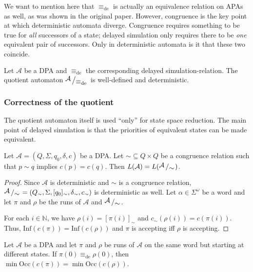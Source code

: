 We want to mention here that $\equiv_\text{de}$ is actually an equivalence relation on APAs as well, as was shown in the original paper. However, congruence is the key point at which deterministic automata diverge. Congruence requires something to be true for \emph{all} successors of a state; delayed simulation only requires there to be \emph{one} equivalent pair of successors. Only in deterministic automata is it that these two coincide.

\begin{cor}
	Let $\mathcal{A}$ be a DPA and $\equiv_\text{de}$ the corresponding delayed simulation-relation. The quotient automaton $\bigslant{\mathcal{A}}{\equiv_\text{de}}$ is well-defined and deterministic.
\end{cor}



\vspace{1cm}
\subsubsection*{Correctness of the quotient}
The quotient automaton itself is used \enquote{only} for state space reduction. The main point of delayed simulation is that the priorities of equivalent states can be made equivalent. 

\begin{theorem}
	Let $\mathcal{A} = (Q, \Sigma, q_0, \delta, c)$ be a DPA. Let $\sim \subseteq Q \times Q$ be a congruence relation such that $p \sim q$ implies $c(p) = c(q)$. Then $L(\mathcal{A}) = L(\bigslant{\mathcal{A}}{\sim})$.
\end{theorem}

\begin{proof}
	Since $\mathcal{A}$ is deterministic and $\sim$ is a congruence relation, $\bigslant{\mathcal{A}}{\sim} = (Q_\sim, \Sigma, [q_0]_\sim, \delta_\sim, c_\sim)$ is deterministic as well. Let $\alpha \in \Sigma^\omega$ be a word and let $\pi$ and $\rho$ be the runs of $\mathcal{A}$ and $\bigslant{\mathcal{A}}{\sim}$. 
		
	For each $i \in \mathbb{N}$, we have $\rho(i) = [\pi(i)]_\sim$ and $c_\sim(\rho(i)) = c(\pi(i))$. Thus, $\text{Inf}(c(\pi)) = \text{Inf}(c(\rho))$ and $\pi$ is accepting iff $\rho$ is accepting.
\end{proof}

\begin{lem}
\label{lem:fritzwilke:equiv_states_same_minpri}
	Let $\mathcal{A}$ be a DPA and let $\pi$ and $\rho$ be runs of $\mathcal{A}$ on the same word but starting at different states. If $\pi(0) \equiv_\text{de} \rho(0)$, then $\min \text{Occ}(c(\pi)) = \min \text{Occ}(c(\rho))$.
\end{lem}

